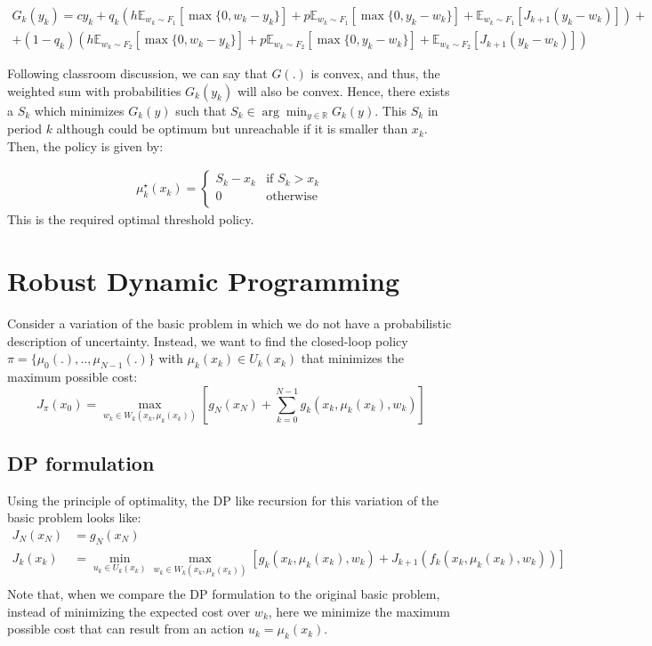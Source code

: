 \documentclass[11pt, oneside]{article}   	%
\begin{document}
\begin{align*}
G_k(y_k)=cy_k+q_k(h\mathbb{E}_{w_k \sim F_1}[\max\{0,w_k-y_k\}]+p\mathbb{E}_{w_k \sim F_1}[\max\{0,y_k-w_k\}]+\mathbb{E}_{w_k \sim F_1}[J_{k+1}(y_k-w_k)])+\\
+(1-q_k)(h\mathbb{E}_{w_k \sim F_2}[\max\{0,w_k-y_k\}]+p\mathbb{E}_{w_k \sim F_2}[\max\{0,y_k-w_k\}]+\mathbb{E}_{w_k \sim F_2}[J_{k+1}(y_k-w_k)])
\end{align*}

Following classroom discussion, we can say that $G(.)$ is convex, and thus, the weighted sum with probabilities $G_k(y_k)$ will also be convex. Hence, there exists a $S_k$ which minimizes $G_k(y)$ such that $S_k \in \arg \min_{y \in \mathbb{R}} G_k(y)$. This $S_k$ in period $k$ although could be optimum but unreachable if it is smaller than $x_k$. Then, the policy is given by:

\begin{align*}
\mu_k^{\star}(x_k)=
\begin{cases}
S_k-x_k & \text{if }S_k>x_k\\
0 & \text{otherwise }\\
\end{cases}
\end{align*}
This is the required optimal threshold policy.

\section{Robust Dynamic Programming}
Consider a variation of the basic problem in which we do not have a probabilistic description of uncertainty. Instead, we want to find the closed-loop policy $\pi = \{\mu_0(.),..,\mu_{N-1}(.)\}$ with $\mu_k(x_k) \in U_k(x_k)$ that minimizes the maximum possible cost:
$$
J_{\pi}(x_0) = \max_{w_k \in W_k(x_k,\mu_k(x_k))} \left[ g_N(x_N) + \sum_{k=0}^{N-1} g_k(x_k,\mu_k(x_k), w_k)\right]
$$

\subsection{DP formulation}
Using the principle of optimality, the DP like recursion for this variation of the basic problem looks like:
\begin{align*}
J_{N}(x_{N}) &= g_N(x_N)\\
J_{k}(x_{k}) &= \min_{u_k \in U_k(x_k)} \max_{w_k \in W_k(x_k,\mu_k(x_k))} \left[ g_k(x_k,\mu_k(x_k),w_k) + J_{k+1}(f_k(x_k,\mu_k(x_k),w_k))\right]\\
\end{align*}
Note that, when we compare the DP formulation to the original basic problem, instead of minimizing the expected cost over $w_k$, here we minimize the maximum possible cost that can result from an action $u_k=\mu_k(x_k)$.
\end{document}
